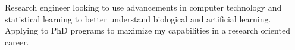 Research engineer looking to use advancements in computer technology and statistical learning to better understand biological and artificial learning. Applying to PhD programs to maximize my capabilities in a research oriented career.
